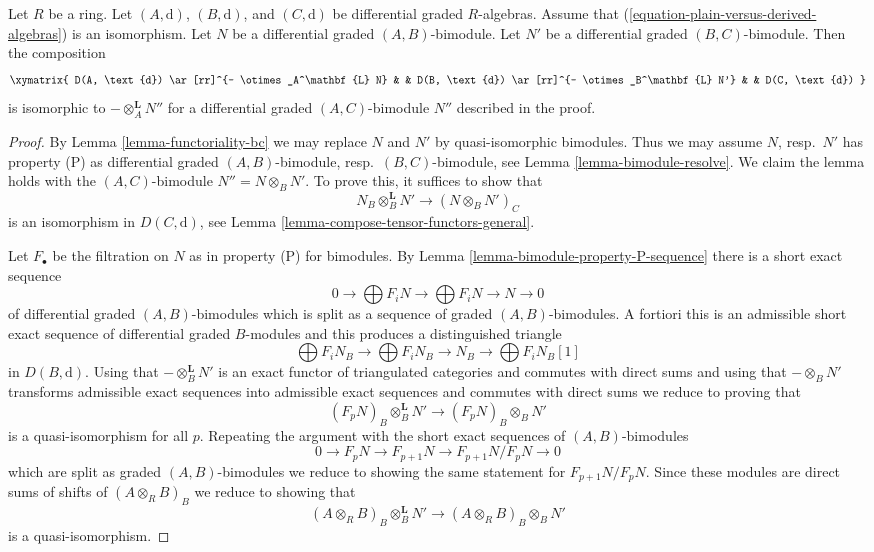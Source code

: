 \begin{lemma}
\label{lemma-compose-tensor-functors-general-algebra}
Let $R$ be a ring. Let $(A, \text{d})$, $(B, \text{d})$, and
$(C, \text{d})$ be differential graded $R$-algebras. Assume
that (\ref{equation-plain-versus-derived-algebras}) is an isomorphism.
Let $N$ be a differential graded $(A, B)$-bimodule.
Let $N'$ be a differential graded $(B, C)$-bimodule.
Then the composition
$$
\xymatrix{
D(A, \text{d}) \ar[rr]^{- \otimes_A^\mathbf{L} N} & &
D(B, \text{d}) \ar[rr]^{- \otimes_B^\mathbf{L} N'} & &
D(C, \text{d})
}
$$
is isomorphic to $- \otimes_A^\mathbf{L} N''$ for a differential graded
$(A, C)$-bimodule $N''$ described in the proof.
\end{lemma}

\begin{proof}
By Lemma \ref{lemma-functoriality-bc} we may replace $N$ and $N'$ by
quasi-isomorphic bimodules. Thus we may assume $N$, resp.\ $N'$
has property (P) as differential graded
$(A, B)$-bimodule, resp.\ $(B, C)$-bimodule, see
Lemma \ref{lemma-bimodule-resolve}. We claim the lemma holds
with the $(A, C)$-bimodule $N'' = N \otimes_B N'$.
To prove this, it suffices to show that
$$
N_B \otimes_B^\mathbf{L} N' \longrightarrow (N \otimes_B N')_C
$$
is an isomorphism in $D(C, \text{d})$, see
Lemma \ref{lemma-compose-tensor-functors-general}.

\medskip\noindent
Let $F_\bullet$ be the filtration on $N$ as in property (P) for bimodules.
By Lemma \ref{lemma-bimodule-property-P-sequence}
there is a short exact sequence
$$
0 \to
\bigoplus\nolimits F_iN \to
\bigoplus\nolimits F_iN \to N \to 0
$$
of differential graded $(A, B)$-bimodules which is split as a sequence
of graded $(A, B)$-bimodules. A fortiori this is an admissible short exact
sequence of differential graded $B$-modules and this produces a distinguished
triangle
$$
\bigoplus\nolimits F_iN_B \to
\bigoplus\nolimits F_iN_B \to N_B \to
\bigoplus\nolimits F_iN_B[1]
$$
in $D(B, \text{d})$. Using that $- \otimes_B^\mathbf{L} N'$
is an exact functor of triangulated categories and commutes
with direct sums and using that $- \otimes_B N'$ transforms
admissible exact sequences into admissible exact sequences
and commutes with direct sums we reduce to proving
that
$$
(F_pN)_B \otimes_B^\mathbf{L} N' \longrightarrow (F_pN)_B \otimes_B N'
$$
is a quasi-isomorphism for all $p$. Repeating the argument
with the short exact sequences of $(A, B)$-bimodules
$$
0 \to F_pN \to F_{p + 1}N \to F_{p + 1}N/F_pN \to 0
$$
which are split as graded $(A, B)$-bimodules
we reduce to showing the same statement for $F_{p + 1}N/F_pN$.
Since these modules are direct sums of shifts of $(A \otimes_R B)_B$
we reduce to showing that
$$
(A \otimes_R B)_B \otimes_B^\mathbf{L} N'
\longrightarrow
(A \otimes_R B)_B \otimes_B N'
$$
is a quasi-isomorphism.


\end{proof}
